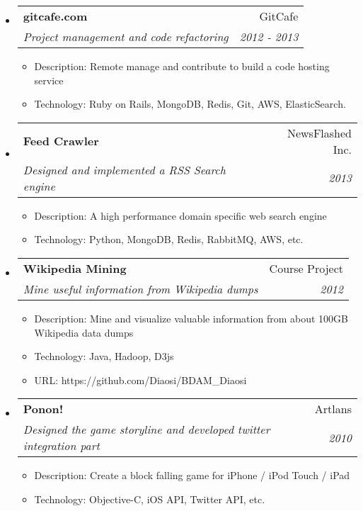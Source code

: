 \documentclass[twoside,letterpaper,11pt]{article}
\makeatletter
\newcommand{\resitem}[1]{\item #1 \vspace{-5pt}}
\newcommand{\resheading}[1]{
  \parbox{\textwidth}{
    \begin{shaded}
      \textbf{\sffamily{\mbox{~}{\large #1} \vphantom{p\^{E}}}}
    \end{shaded}
  }\vspace{-6px}
}
\newcommand{\ressubheading}[4]{
\begin{tabular*}{7in}{l@{\extracolsep{\fill}}r}
		\textbf{#1} & #2 \\
		\textit{#3} & \textit{#4} \\
\end{tabular*}\vspace{-6pt}}
\makeatother
\begin{document}
\resheading{Projects}
\begin{itemize}
\item
	\ressubheading{gitcafe.com}{GitCafe}{Project management and code refactoring}{2012 - 2013}
	\begin{itemize}
		\resitem{Description: Remote manage and contribute to build a code hosting service}
		\resitem{Technology: Ruby on Rails, MongoDB, Redis, Git, AWS, ElasticSearch.}
	\end{itemize}

\item
	\ressubheading{Feed Crawler}{NewsFlashed Inc.}{Designed and implemented a RSS Search engine}{2013}
	\begin{itemize}
		\resitem{Description: A high performance domain specific web search engine}
		\resitem{Technology: Python, MongoDB, Redis, RabbitMQ, AWS, etc.}
	\end{itemize}

\item
	\ressubheading{Wikipedia Mining}{Course Project}{Mine useful information from Wikipedia dumps}{2012}
	\begin{itemize}
		\resitem{Description: Mine and visualize valuable information from about 100GB Wikipedia data dumps}
		\resitem{Technology: Java, Hadoop, D3js}
		\resitem{URL: https://github.com/Diaosi/BDAM\_Diaosi}
	\end{itemize}



\item
	\ressubheading{Ponon!}{Artlans}{Designed the game storyline and developed twitter integration part}{2010}
	\begin{itemize}
		\resitem{Description: Create a block falling game for iPhone / iPod Touch / iPad}
		\resitem{Technology: Objective-C, iOS API, Twitter API, etc.}
	\end{itemize}


\end{itemize}
\end{document}
